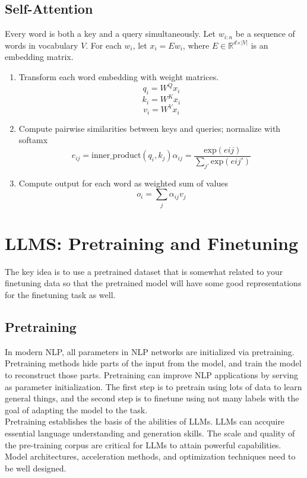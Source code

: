 \documentclass{article}
\begin{document}
\subsection{Self-Attention}

Every word is both a key and a query simultaneously. Let $w_{i:n}$ be a sequence of words in vocabulary $V$. For each $w_i$, let $x_i = Ew_i$, where $E \in \mathbb{R}^{d \times \vert V \vert}$ is an embedding matrix. 
\begin{enumerate}
  \item Transform each word embedding with weight matrices. $$q_i = W^Q x_i$$ $$k_i = W^K x_i$$ $$v_i = W^V x_i$$ 
  \item Compute pairwise similarities between keys and queries; normalize with softamx $$e_{ij} = \textrm{inner\_product}(q_i, k_j) \alpha_{ij} = \frac{\textrm{exp}(eij)}{\sum_{j'}\textrm{exp}(eij')}$$  
  \item Compute output for each word as weighted sum of values $$o_i = \sum_j \alpha_{ij} v_j$$
\end{enumerate}

\section{LLMS: Pretraining and Finetuning}

The key idea is to use a pretrained dataset that is somewhat related to your finetuning data so that the pretrained model will have some good representations for the finetuning task as well. \\ 

\subsection{Pretraining}

In modern NLP, all parameters in NLP networks are initialized via pretraining. Pretraining methods hide parts of the input from the model, and train the model to reconstruct those parts. Pretraining can improve NLP applications by serving as parameter initialization. The first step is to pretrain using lots of data to learn general things, and the second step is to finetune using not many labels with the goal of adapting the model to the task. \\ 

Pretraining establishes the basis of the abilities of LLMs. LLMs can accquire essential language understanding and generation skills. The scale and quality of the pre-training corpus are critical for LLMs to attain powerful capabilities. Model architectures, acceleration methods, and optimization techniques need to be well designed. \\ 
\end{document}
